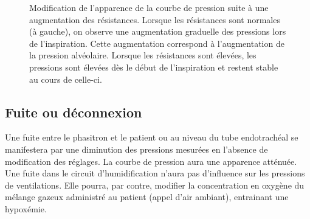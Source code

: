 \begin{figure}

	\caption[Modification de l'apparence de la courbe de pression suite à une
	augmentation des résistances.]{Modification de l'apparence de la courbe de pression suite à une
augmentation des résistances. Lorsque les résistances sont normales (à gauche),
on observe une augmentation graduelle des pressions lors de l'inspiration.
Cette augmentation correspond à l'augmentation de la pression alvéolaire.
Lorsque les résistances sont élevées, les pressions sont élevées dès le début
de l'inspiration et restent stable au cours de celle-ci.}
\end{figure}

\subsection{Fuite ou déconnexion}

Une fuite entre le phasitron et le patient ou au niveau du tube endotrachéal se
manifestera par une diminution des pressions mesurées en l'absence de
modification des réglages. La courbe de pression aura une apparence atténuée.
Une fuite dans le circuit d'humidification n’aura pas d'influence sur les
pressions de ventilations. Elle pourra, par contre, modifier la concentration
en oxygène du mélange gazeux administré au patient (appel d’air ambiant),
entrainant une hypoxémie.
